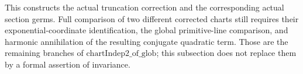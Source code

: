 This constructs the actual truncation correction and
the corresponding actual section germs.
Full comparison of two different corrected charts still
requires their exponential-coordinate identification,
the global primitive-line comparison, and harmonic
annihilation of the resulting conjugate quadratic term.
Those are the remaining branches of
\(\mathrm{chartIndep2\_of\_glob}\); this subsection does
not replace them by a formal assertion of invariance.
